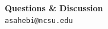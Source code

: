 \documentclass[aspectratio=169,10pt]{beamer}
\begin{document}

\begin{frame}{}
\begin{center}
\vspace{2.2cm}
{\Large \textbf{Questions \& Discussion}}\\[20pt]
{\normalsize \texttt{asahebi@ncsu.edu}}
\end{center}
\end{frame}


\end{document}
